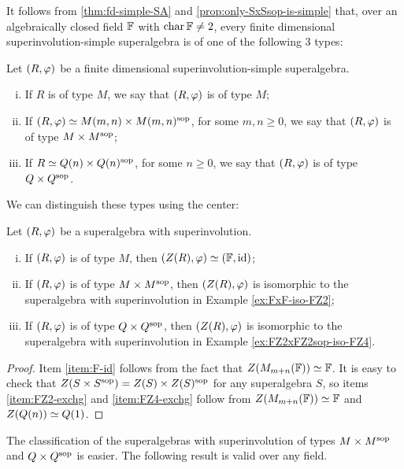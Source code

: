 It follows from \cref{thm:fd-simple-SA} and \cref{prop:only-SxSsop-is-simple} that, over an algebraically closed field $\mathbb{F}$ with $\operatorname{char} \mathbb{F} \neq 2$, every finite dimensional superinvolution-simple superalgebra is of one of the following 3 types:

\begin{defi}
    Let $(R, \varphi)$ be a finite dimensional superinvolution-simple superalgebra. 
    \begin{enumerate}[(i)]
        \item If $R$ is of type $M$, we say that $(R, \varphi)$ is of type $M$;
        \item If $(R, \varphi) \simeq M(m,n) \times M(m,n)^{\mathrm{sop}}$, for some $m,n \geq 0$, we say that $(R, \varphi)$ is of type $M\times M^{\mathrm{sop}}$;
        \item If $R \simeq Q(n) \times Q(n)^{\mathrm{sop}}$, for some $n \geq 0$, we say that $(R, \varphi)$ is of type $Q \times Q^{\mathrm{sop}}$.
    \end{enumerate}
\end{defi}

We can distinguish these types using the center:

\begin{prop}\label{prop:types-of-SA-via-center}
	Let $(R, \varphi)$ be a superalgebra with superinvolution.
	\begin{enumerate}[(i)]
		\item If $(R, \varphi)$ is of type $M$, then $(Z(R), \varphi) \simeq (\mathbb{F}, \operatorname{id})$;\label{item:F-id}
		\item If $(R, \varphi)$ is of type $M\times M^{\mathrm{sop}}$, then $(Z(R), \varphi)$ is isomorphic to the superalgebra with superinvolution in Example \ref{ex:FxF-iso-FZ2};\label{item:FZ2-exchg}
		\item If $(R, \varphi)$ is of type $Q\times Q^{\mathrm{sop}}$, then $(Z(R), \varphi)$ is isomorphic to the superalgebra with superinvolution in Example \ref{ex:FZ2xFZ2sop-iso-FZ4}.\label{item:FZ4-exchg}
	\end{enumerate}
\end{prop}

\begin{proof}
	Item \eqref{item:F-id} follows from the fact that $Z(M_{m+n}(\mathbb{F})) \simeq \mathbb{F}$.
	It is easy to check that $Z(S\times S^{\mathrm{sop}}) = Z(S) \times Z(S)^{\mathrm{sop}}$ for any superalgebra $S$, so items \eqref{item:FZ2-exchg} and \eqref{item:FZ4-exchg} follow from $Z(M_{m+n}(\mathbb{F})) \simeq \mathbb{F}$ and $Z(Q(n)) \simeq Q(1)$.
\end{proof}

The classification of the superalgebras with superinvolution of types $M\times M^{\mathrm{sop}}$ and $Q\times Q^{\mathrm{sop}}$ is easier. 
The following result is valid over any field.

